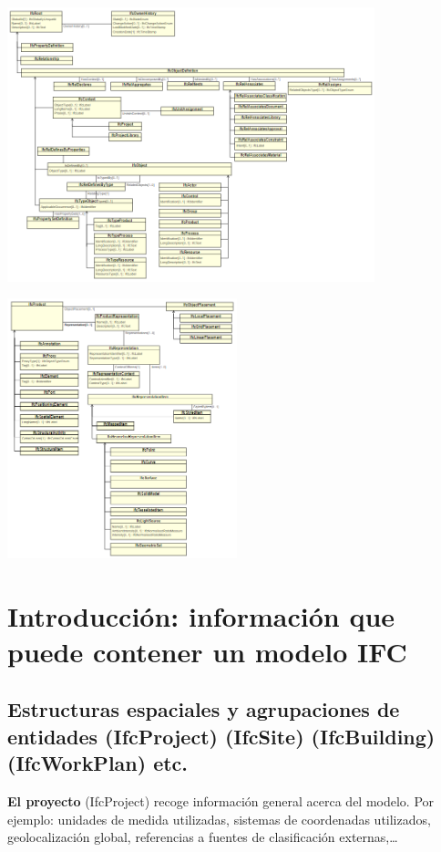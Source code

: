\documentclass[spanish,12pt,a4paper,final,oneside]{book}
\begin{document}
\includegraphics[width=0.8\textwidth]{principales relaciones entre los elementos principales}
\begin{flushright} \includegraphics[width=0.5\textwidth]{principales relaciones de IfcProduct} \end{flushright} 


\chapter{Introducción: información que puede contener un modelo IFC}

\section{Estructuras espaciales y agrupaciones de entidades (IfcProject) (IfcSite) (IfcBuilding) (IfcWorkPlan) etc.}
\textbf{El proyecto} (IfcProject) recoge información general acerca del modelo. Por ejemplo: unidades de medida utilizadas, sistemas de coordenadas utilizados, geolocalización global, referencias a fuentes de clasificación externas,\ldots 
\end{document}
